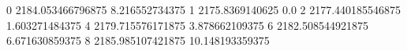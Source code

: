0 2184.053466796875 8.216552734375
1 2175.8369140625 0.0
2 2177.440185546875 1.603271484375
4 2179.715576171875 3.878662109375
6 2182.508544921875 6.671630859375
8 2185.985107421875 10.148193359375

